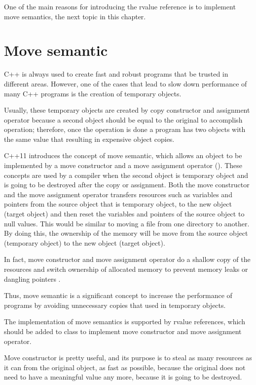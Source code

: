 \documentclass[11pt]{report}
\begin{document}
One of the main reasons for introducing the rvalue reference is to implement move semantics, the next topic in this chapter.

\section{Move semantic}
\label{section: Move semantic}
C++ is always used to create fast and robust programs that be trusted in different areas.  However, one of the cases that lead to slow down performance of many C++ programs is the creation of temporary objects.

Usually, these temporary objects are created by copy constructor and assignment operator because a second object should be equal to the original to accomplish operation; therefore, once the operation is done a program has two objects with the same value that resulting in expensive object copies.

C++11 introduces the concept of move semantic, which allows an object to be implemented by a move constructor and a move assignment operator (\cite{Gregorie:professionalcpp}). These concepts are used by a compiler when the second object is temporary object and is going to be destroyed after the copy or assignment. Both the move constructor and the move assignment operator transfers resources such as variables and pointers from the source object that is temporary object, to the new object (target object) and then reset the variables and pointers of the source object to null values. This would be similar to moving a file from one directory to another. By doing this, the ownership of the memory will be move from the source object (temporary object) to the new object (target object).

In fact, move constructor and move assignment operator do a shallow copy of the resources and switch ownership of allocated memory to prevent memory leaks or dangling pointers \cite{Gregorie:professionalcpp}.

Thus, move semantic is a significant concept to increase the performance of programs by avoiding unnecessary copies that used in temporary objects.

The implementation of move semantics is supported by rvalue references, which should be added to class to implement move constructor and move assignment operator.

Move constructor is pretty useful, and its purpose is to steal as many resources as it can from the original object, as fast as possible, because the original does not need to have a meaningful value any more, because it is going to be destroyed. 
\end{document}
